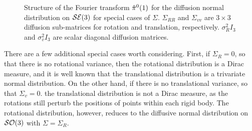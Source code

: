 \documentclass[../../main.tex]{subfiles}
\begin{document}
\begin{refsection}
\begin{figure}
\begin{subfigure}[b]{0.31\textwidth}
		\end{subfigure}
		\caption[Structure of the diffusion normal Fourier transform for $\SE{3}$]{
			Structure of the Fourier transform $\hat{\pi}^0(1)$ for the diffusion normal distribution on $\SE{3}$ for special cases of $\Sigma$.
			$\Sigma_{RR}$ and $\Sigma_{vv}$ are $3 \times 3$ diffusion sub-matrices for rotation and translation, respectively.
			$\sigma_R^2 I_3$ and $\sigma_v^2 I_3$ are scalar diagonal diffusion matrices.
		}
		\label{fig:diffnorm_ftrans_se3}
	\end{figure}

	There are a few additional special cases worth considering.
	First, if $\Sigma_{R} = 0$, so that there is no rotational variance, then the rotational distribution is a Dirac measure, and it is well known that the translational distribution is a trivariate normal distribution.
	On the other hand, if there is no translational variance, so that $\Sigma_v=0$. the translational distribution is not a Dirac measure, as the rotations still perturb the positions of points within each rigid body.
	The rotational distribution, however, reduces to the diffusive normal distribution on $\mathcal{SO} (3)$ with $\Sigma = \Sigma_R$.


\end{refsection}
\end{document}
